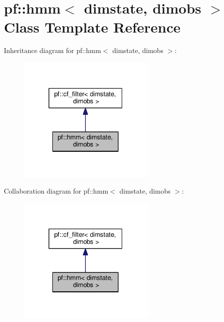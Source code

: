 \hypertarget{classpf_1_1hmm}{}\section{pf\+:\+:hmm$<$ dimstate, dimobs $>$ Class Template Reference}
\label{classpf_1_1hmm}


Inheritance diagram for pf\+:\+:hmm$<$ dimstate, dimobs $>$\+:
\nopagebreak
\begin{figure}[H]
\begin{center}
\leavevmode
\includegraphics[width=193pt]{classpf_1_1hmm__inherit__graph}
\end{center}
\end{figure}


Collaboration diagram for pf\+:\+:hmm$<$ dimstate, dimobs $>$\+:
\nopagebreak
\begin{figure}[H]
\begin{center}
\leavevmode
\includegraphics[width=193pt]{classpf_1_1hmm__coll__graph}
\end{center}
\end{figure}
